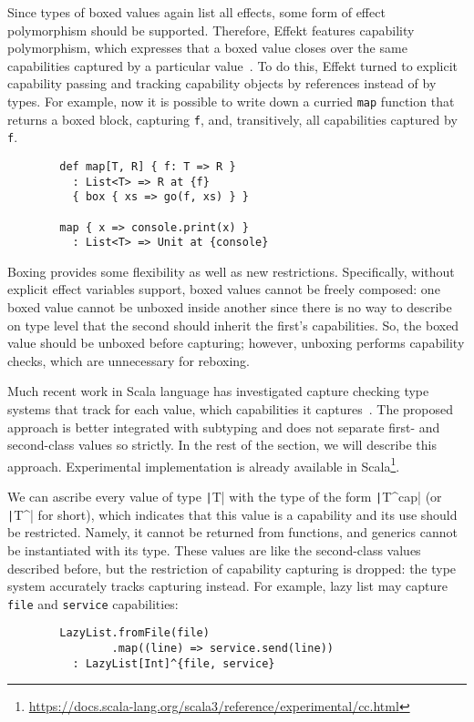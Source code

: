 \documentclass[conference]{IEEEtran}
\begin{document}
    Since types of boxed values again list all effects, some form of effect polymorphism should be supported.
    Therefore, Effekt features capability polymorphism, which expresses that a boxed value closes over the same capabilities captured by a particular value~\cite{brachthauser2022effects}.
    To do this, Effekt turned to explicit capability passing and tracking capability objects by references instead of by types.
    For example, now it is possible to write down a curried \texttt{map} function that returns a boxed block, capturing \texttt{f}, and, transitively, all capabilities captured by \texttt{f}.
    \begin{verbatim}
        def map[T, R] { f: T => R }
          : List<T> => R at {f}
          { box { xs => go(f, xs) } }

        map { x => console.print(x) }
          : List<T> => Unit at {console}
    \end{verbatim}

    Boxing provides some flexibility as well as new restrictions.
    Specifically, without explicit effect variables support, boxed values cannot be freely composed: one boxed value cannot be unboxed inside another since there is no way to describe on type level that the second should inherit the first's capabilities.
    So, the boxed value should be unboxed before capturing; however, unboxing performs capability checks, which are unnecessary for reboxing.

    Much recent work in Scala language has investigated capture checking type systems that track for each value, which capabilities it captures~\cite{odersky2022scoped, boruch2023capturing}.
    The proposed approach is better integrated with subtyping and does not separate first- and second-class values so strictly.
    In the rest of the section, we will describe this approach.
    Experimental implementation is already available in Scala\footnote{\url{https://docs.scala-lang.org/scala3/reference/experimental/cc.html}}.

    We can ascribe every value of type \texttt|T| with the type of the form \texttt|T^{cap}| (or \texttt|T^| for short), which indicates that this value is a capability and its use should be restricted.
    Namely, it cannot be returned from functions, and generics cannot be instantiated with its type.
    These values are like the second-class values described before, but the restriction of capability capturing is dropped: the type system accurately tracks capturing instead.
    For example, lazy list may capture \texttt{file} and \texttt{service} capabilities:
    \begin{verbatim}
        LazyList.fromFile(file)
                .map((line) => service.send(line))
          : LazyList[Int]^{file, service}
    \end{verbatim}
\end{document}
